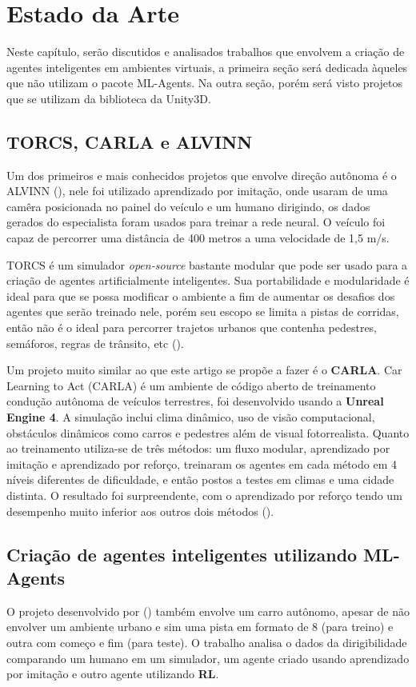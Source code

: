\chapter{Estado da Arte}\label{cap:estArte}
Neste capítulo, serão discutidos e analisados trabalhos que envolvem a criação de agentes inteligentes em ambientes virtuais, a primeira seção será dedicada àqueles que não utilizam o pacote ML-Agents. Na outra seção, porém será visto projetos que se utilizam da biblioteca da Unity3D.

\section*{TORCS, CARLA e ALVINN}
Um dos primeiros e mais conhecidos projetos que envolve direção autônoma é o ALVINN (), nele foi utilizado aprendizado por imitação, onde usaram de uma camêra posicionada no painel do veículo e um humano dirigindo, os dados gerados do especialista foram usados para treinar a rede neural. O veículo foi capaz de percorrer uma distância de 400 metros a uma velocidade de 1,5 m/s. 

TORCS é um simulador \textit{open-source} bastante modular que pode ser usado para a criação de agentes artificialmente inteligentes. Sua portabilidade e modularidade é ideal para que se possa modificar o ambiente a fim de aumentar os desafios dos agentes que serão treinado nele, porém seu escopo se limita a pistas de corridas, então não é o ideal para percorrer trajetos urbanos que contenha pedestres, semáforos, regras de trânsito, etc ().

Um projeto muito similar ao que este artigo se propõe a fazer é o \textbf{CARLA}. Car Learning to Act (CARLA) é um ambiente de código aberto de treinamento condução autônoma de veículos terrestres, foi desenvolvido usando a \textbf{Unreal Engine 4}. A simulação inclui clima dinâmico, uso de visão computacional, obstáculos dinâmicos como carros e pedestres além de visual fotorrealista. Quanto ao treinamento utiliza-se de três métodos: um fluxo modular, aprendizado por imitação e aprendizado por reforço, treinaram os agentes em cada método em 4 níveis diferentes de dificuldade, e então postos a testes em climas e uma cidade distinta. O resultado foi surpreendente, com o aprendizado por reforço tendo um desempenho muito inferior aos outros dois métodos ().

\section*{Criação de agentes inteligentes utilizando ML-Agents}\label{sec:primTrab}
O projeto desenvolvido por () também envolve um carro autônomo, apesar de não envolver um ambiente urbano e sim uma pista em formato de 8 (para treino) e outra com começo e fim (para teste). O trabalho analisa o dados da dirigibilidade comparando um humano em um simulador, um agente criado usando aprendizado por imitação e outro agente utilizando \textbf{RL}. 

